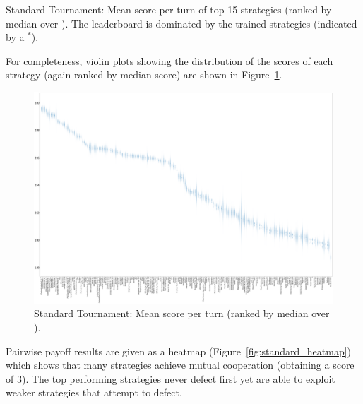 \documentclass{article}
\begin{document}
\begin{table}[!hbtp]
        \centering
        
        \caption{Standard Tournament: Mean score per turn of top 15 strategies
            (ranked by median over
        \protecttournaments).
        The leaderboard is dominated by the trained strategies (indicated by a
        $^{*}$).}
        \label{tbl:standard_score}
\end{table}

For completeness, violin plots showing the distribution of the scores of each
strategy (again ranked by median score) are shown in
Figure~\ref{fig:standard_boxplot}.

\begin{landscape}
    \begin{figure}[!hbtp]
        \centering
        \includegraphics[width=\paperwidth]{./assets/standard_scores_boxplots.pdf}
        \caption{Standard Tournament: Mean score per turn (ranked by median
        over
        \protecttournaments).}
        \label{fig:standard_boxplot}
    \end{figure}
\end{landscape}

Pairwise payoff results are given as a heatmap (Figure~\ref{fig:standard_heatmap})
which shows that many strategies achieve mutual cooperation (obtaining a score
of 3). The top performing
strategies never defect first yet are able to exploit weaker strategies that
attempt to defect.
\end{document}

